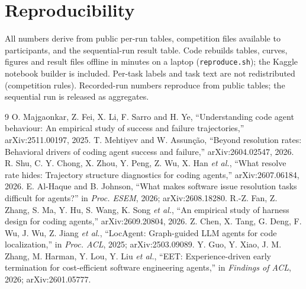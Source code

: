 \documentclass[10pt,twocolumn]{article}
\begin{document}
\section{Reproducibility}
All numbers derive from public per-run tables, competition files available to participants, and the sequential-run result table. Code rebuilds tables, curves, figures and result files offline in minutes on a laptop (\texttt{reproduce.sh}); the Kaggle notebook builder is included. Per-task labels and task text are not redistributed (competition rules). Recorded-run numbers reproduce from public tables; the sequential run is released as aggregates.

\begin{thebibliography}{9}
\small
{} O. Majgaonkar, Z. Fei, X. Li, F. Sarro and H. Ye, ``Understanding code agent behaviour: An empirical study of success and failure trajectories,'' arXiv:2511.00197, 2025.
 T. Mehtiyev and W. Assun\c{c}\~ao, ``Beyond resolution rates: Behavioral drivers of coding agent success and failure,'' arXiv:2604.02547, 2026.
 R. Shu, C. Y. Chong, X. Zhou, Y. Peng, Z. Wu, X. Han \emph{et al.}, ``What resolve rate hides: Trajectory structure diagnostics for coding agents,'' arXiv:2607.06184, 2026.
 E. Al-Haque and B. Johnson, ``What makes software issue resolution tasks difficult for agents?'' in \emph{Proc. ESEM}, 2026; arXiv:2608.18280.
 R.-Z. Fan, Z. Zhang, S. Ma, Y. Hu, S. Wang, K. Song \emph{et al.}, ``An empirical study of harness design for coding agents,'' arXiv:2609.20804, 2026.
 Z. Chen, X. Tang, G. Deng, F. Wu, J. Wu, Z. Jiang \emph{et al.}, ``LocAgent: Graph-guided LLM agents for code localization,'' in \emph{Proc. ACL}, 2025; arXiv:2503.09089.
 Y. Guo, Y. Xiao, J. M. Zhang, M. Harman, Y. Lou, Y. Liu \emph{et al.}, ``EET: Experience-driven early termination for cost-efficient software engineering agents,'' in \emph{Findings of ACL}, 2026; arXiv:2601.05777.
\end{thebibliography}
\end{document}
